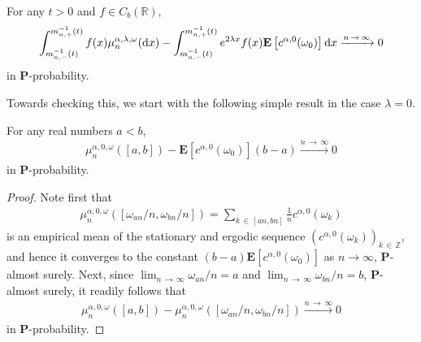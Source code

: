 \documentclass[AHL,Unicode,longabstracts,published]{cedram}
\newcommand{\Z}{\mathbb Z}
\newcommand{\R}{\mathbb R}
\newcommand{\bfP}{\mathbf{P}}
\newcommand{\bfE}{\mathbf{E}}
\newcommand{\dd}{\text{\upshape{d}}}
\begin{document}
\begin{prop}\label{prop:inv_meas}
For any $t>0$ and $f\in C_b(\R)$,
\begin{equation*}
\int_{m_{n,-}^{-1}(t)}^{m_{n,+}^{-1}(t)}f(x)\mu_n^{\alpha,\lambda,\omega}(\dd x)-
\int_{m_{n,-}^{-1}(t)}^{m_{n,+}^{-1}(t)}e^{2\lambda x}f(x)\bfE\left[c^{\alpha,0}(\omega_0)\right]\dd x\xrightarrow{n\,\to\,\infty} 0
\end{equation*}
in $\bfP$-probability.
\end{prop}

Towards checking this, we start with the following simple result in the case $\lambda=0$.

\begin{lemm}\label{lem:quantitativeLLN}
For any real numbers $a<b$,
\begin{align*}
\mu^{\alpha,0,\omega}_n([a,b])-\bfE\left[c^{\alpha,0}(\omega_0)\right](b-a)\xrightarrow{n\,\to\,\infty} 0
\end{align*}
in $\bfP$-probability.
\end{lemm}

\begin{proof}
Note first that
\begin{align*}
\mu^{\alpha,0,\omega}_n\left(\left[\omega_{an}/n,\omega_{bn}/n\right]\right)=\sum_{k\,\in\,[an,bn]}\frac{1}{n}c^{\alpha,0}(\omega_k)
\end{align*}
is an empirical mean of the stationary and ergodic sequence $(c^{\alpha,0}(\omega_k))_{k\,\in\,\Z}$, and hence it converges to the constant $(b-a)\bfE[c^{\alpha,0}(\omega_0)]$ as $n\to\infty$, $\bfP$-almost surely. Next, since $\lim_{n\,\to\,\infty}\omega_{an}/n= a$ and $\lim_{n\,\to\,\infty}\omega_{bn}/n=b$, $\bfP$-almost surely, it readily follows that
\begin{align*}
\mu^{\alpha,0,\omega}_n([a,b])-\mu^{\alpha,0,\omega}_n([\omega_{an}/n,\omega_{bn}/n])\xrightarrow{n\,\to\,\infty} 0
\end{align*}
in $\bfP$-probability.
\end{proof}
\end{document}
